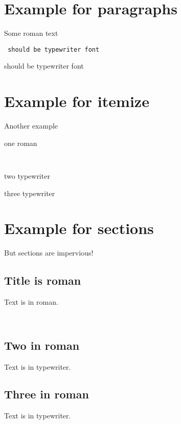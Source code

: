 \documentclass[11pt]{article}
\begin{document}
\section{Example for paragraphs}

Some roman text

{\tt
should be typewriter font

should be typewriter font
}

\section{Example for itemize}

Another example

\begin{itemize}
\item one roman
{\tt
\item two typewriter
\item three typewriter
}
\end{itemize}

\section{Example for sections}
But sections are impervious!

\subsection{Title is roman}
Text is in roman.

{\tt
\subsection{Two in roman}
Text is in typewriter.

\subsection{Three in roman}
Text is in typewriter.
}
\end{document}
